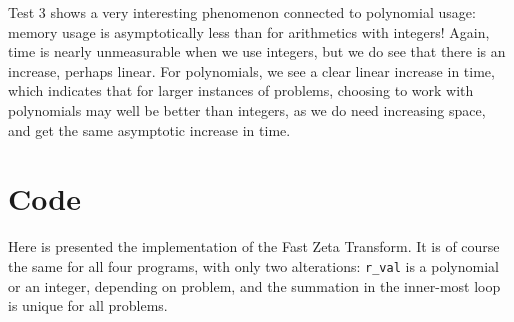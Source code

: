 \documentclass[a4paper, titlepage]{article}
\newcommand{\code}{\texttt}
\begin{document}
Test 3 shows a very interesting phenomenon connected to polynomial usage: memory usage is asymptotically less than for arithmetics with integers! Again, time is nearly unmeasurable when we use integers, but we do see that there is an increase, perhaps linear. For polynomials, we see a clear linear increase in time, which indicates that for larger instances of problems, choosing to work with polynomials may well be better than integers, as we do need increasing space, and get the same asymptotic increase in time.

\section{Code}
Here is presented the implementation of the Fast Zeta Transform. It is of course the same for all four programs, with only two alterations: \code{r\_val} is a polynomial or an integer, depending on problem, and the summation in the inner-most loop is unique for all problems.
\end{document}
